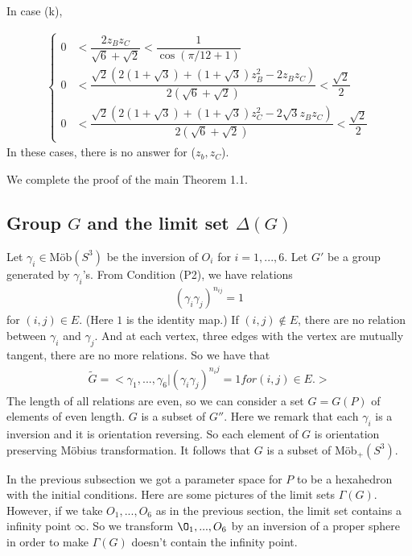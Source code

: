 \documentclass[dvipdfmx]{interact}
\theoremstyle{plain}%
\theoremstyle{definition}
\theoremstyle{remark}
\theoremstyle{problemstyle}
\begin{document}
In case (k),

\begin{align*}
 \begin{cases}
  0 &< \dfrac{2z_Bz_C}{\sqrt{6} + \sqrt{2}} < \dfrac{1}{\cos(\pi/12+1)}\\
  0 &< \dfrac{\sqrt{2}(2 (1 + \sqrt{3}) + (1 + \sqrt{3})z^2_B -2z_Bz_C)}
  {2(\sqrt{6} + \sqrt{2})} < \dfrac{\sqrt{2}}{2}\\
  0 &< \dfrac{\sqrt{2}(2 (1 + \sqrt{3}) + (1 + \sqrt{3})z^2_C
  -2\sqrt{3}z_Bz_C)}
  {2(\sqrt{6} + \sqrt{2})} < \dfrac{\sqrt{2}}{2}
 \end{cases}
\end{align*}
In these cases, there is no answer for ($z_b, z_C$).

We complete the proof of the main Theorem 1.1.

\subsection{Group $G$ and the limit set $\Delta(G)$}
Let $\gamma_i \in \text{M\"ob}(S^3)$ be the inversion of $O_i$ for $i =
1,...,6$.
Let $G'$ be a group generated by $\gamma_i$'s. From Condition (P2), we
have relations
\begin{align*}
 (\gamma_i \gamma_j)^{n_{ij}} = 1
\end{align*}
for $(i, j) \in E.$ (Here $1$ is the identity map.) If $(i, j) \notin E$,
there are no relation between $\gamma_i$ and $\gamma_j$.
And at each vertex, three edges with the vertex are mutually tangent,
there are no more relations. So we have that
\begin{align*}
 \tilde G = <\gamma_1, ...,\gamma_6 | (\gamma_i\gamma_j)^{n_ij} = 1 for
 (i, j) \in E.>
\end{align*}
The length of all relations are even, so we can consider a set $G = G(P)$
of elements of even length. $G$ is a subset of $G''$. Here we remark
that each $\gamma_i$ is a inversion and it is orientation reversing. So
each element of $G$ is orientation preserving M\"obius transformation.
It follows that $G$ is a subset of M\"ob$_+(S^3)$.

In the previous subsection we got a parameter space for $P$ to be a
hexahedron with the initial conditions. Here are some pictures of the
limit sets $\Gamma(G)$. However, if we take $O_1, ..., O_6$ as in the
previous section, the limit set contains a infinity point $\infty$. So
we transform $\O_1, ..., O_6$ by an inversion of a proper sphere in
order to make $\Gamma(G)$ doesn't contain the infinity point.
\end{document}
